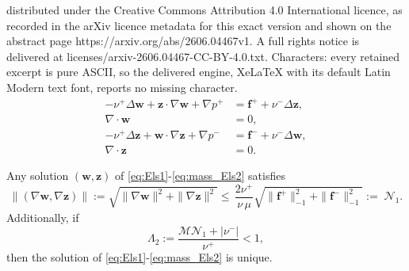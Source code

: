 \documentclass[10pt,a4paper]{amsart}
\def\V#1{\mathbf{#1}}
\def\fminus{\mathbf{f}^{-}}
\def\fplus{\mathbf{f}^{+}}
\def\numinus{\nu^{-}}
\def\nuplus{\nu^{+}}
\def\pminus{p^{-}}
\def\pplus{p^{+}}
\newcommand{\Mbd}{\mathcal{M}}
\newcommand{\Nbd}{\mathcal{N}}
\begin{document}
distributed under the Creative Commons Attribution 4.0 International licence, as recorded in the arXiv licence metadata for this exact version and shown on the abstract page https://arxiv.org/abs/2606.04467v1. A full rights notice is delivered at licenses/arxiv-2606.04467-CC-BY-4.0.txt. Characters: every retained excerpt is pure ASCII, so the delivered engine, XeLaTeX with its default Latin Modern text font, reports no missing character.
\begin{align}
 - \nuplus \Delta \V{w} + \V{z} \cdot \nabla \V{w} + \nabla \pplus 
 & = \fplus  + \numinus \Delta \V{z}
, \label{eq:Els1} \\
\nabla \cdot \V{w} &= 0, \label{eq:mass_Els1} 
\\
- \nuplus \Delta \V{z} + \V{w} \cdot \nabla \V{z} + \nabla \pminus  
& 
=  \fminus + \numinus \Delta \V{w}, \label{eq:Els2} \\
\nabla \cdot \V{z} &= 0. \label{eq:mass_Els2}
\end{align}

\begin{lemma}\label{lem:Stability_Els}
Any solution $(\V{w},\V{z})$ of \eqref{eq:Els1}-\eqref{eq:mass_Els2} satisfies 
\begin{equation}\label{eq:Stability_Els}
 \|(\nabla \V{w},\nabla \V{z})\|:=\sqrt{\| \nabla \V{w} \|^2 + \| \nabla \V{z} \|^2} \le \,
\frac{2\nuplus}{\nu\, \mu} 
\sqrt{\|\fplus\|^2_{-1}+\|\fminus\|^2_{-1}} := \; \Nbd_1.
\end{equation}
Additionally, if 
%
\begin{equation}
	\Lambda_2 := \frac{\Mbd \Nbd_1+|\numinus|}{\nuplus} < 1,
    \label{eq:smalldataUniq_Els}
\end{equation}
then the solution of \eqref{eq:Els1}-\eqref{eq:mass_Els2} is unique. 
\end{lemma}
\end{document}
